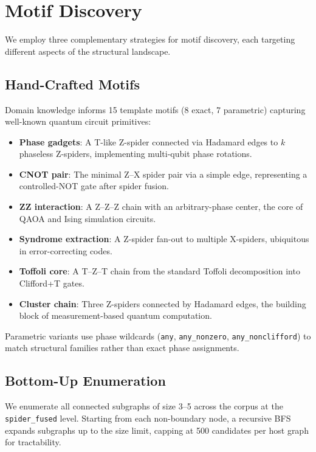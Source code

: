 \documentclass[twocolumn,prl,amsmath,amssymb,superscriptaddress]{revtex4-2}
\begin{document}
\section{Motif Discovery}
\label{sec:discovery}

We employ three complementary strategies for motif discovery, each targeting different aspects of the structural landscape.

\subsection{Hand-Crafted Motifs}

Domain knowledge informs 15 template motifs (8 exact, 7 parametric) capturing well-known quantum circuit primitives:

\begin{itemize}
    \item \textbf{Phase gadgets}: A T-like Z-spider connected via Hadamard edges to $k$ phaseless Z-spiders, implementing multi-qubit phase rotations.
    \item \textbf{CNOT pair}: The minimal Z--X spider pair via a simple edge, representing a controlled-NOT gate after spider fusion.
    \item \textbf{ZZ interaction}: A Z--Z--Z chain with an arbitrary-phase center, the core of QAOA and Ising simulation circuits.
    \item \textbf{Syndrome extraction}: A Z-spider fan-out to multiple X-spiders, ubiquitous in error-correcting codes.
    \item \textbf{Toffoli core}: A T--Z--T chain from the standard Toffoli decomposition into Clifford+T gates.
    \item \textbf{Cluster chain}: Three Z-spiders connected by Hadamard edges, the building block of measurement-based quantum computation.
\end{itemize}

Parametric variants use phase wildcards (\texttt{any}, \texttt{any\_nonzero}, \texttt{any\_nonclifford}) to match structural families rather than exact phase assignments.

\subsection{Bottom-Up Enumeration}

We enumerate all connected subgraphs of size 3--5 across the corpus at the \texttt{spider\_fused} level.
Starting from each non-boundary node, a recursive BFS expands subgraphs up to the size limit, capping at 500 candidates per host graph for tractability.
\end{document}
